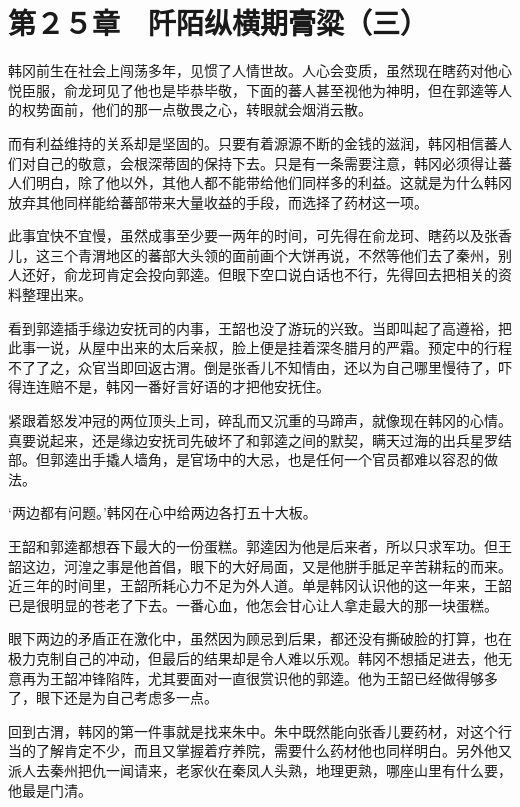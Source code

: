 \section{第２５章　阡陌纵横期膏粱（三）}

韩冈前生在社会上闯荡多年，见惯了人情世故。人心会变质，虽然现在瞎药对他心悦臣服，俞龙珂见了他也是毕恭毕敬，下面的蕃人甚至视他为神明，但在郭逵等人的权势面前，他们的那一点敬畏之心，转眼就会烟消云散。

而有利益维持的关系却是坚固的。只要有着源源不断的金钱的滋润，韩冈相信蕃人们对自己的敬意，会根深蒂固的保持下去。只是有一条需要注意，韩冈必须得让蕃人们明白，除了他以外，其他人都不能带给他们同样多的利益。这就是为什么韩冈放弃其他同样能给蕃部带来大量收益的手段，而选择了药材这一项。

此事宜快不宜慢，虽然成事至少要一两年的时间，可先得在俞龙珂、瞎药以及张香儿，这三个青渭地区的蕃部大头领的面前画个大饼再说，不然等他们去了秦州，别人还好，俞龙珂肯定会投向郭逵。但眼下空口说白话也不行，先得回去把相关的资料整理出来。

看到郭逵插手缘边安抚司的内事，王韶也没了游玩的兴致。当即叫起了高遵裕，把此事一说，从屋中出来的太后亲叔，脸上便是挂着深冬腊月的严霜。预定中的行程不了了之，众官当即回返古渭。倒是张香儿不知情由，还以为自己哪里慢待了，吓得连连赔不是，韩冈一番好言好语的才把他安抚住。

紧跟着怒发冲冠的两位顶头上司，碎乱而又沉重的马蹄声，就像现在韩冈的心情。真要说起来，还是缘边安抚司先破坏了和郭逵之间的默契，瞒天过海的出兵星罗结部。但郭逵出手撬人墙角，是官场中的大忌，也是任何一个官员都难以容忍的做法。

‘两边都有问题。’韩冈在心中给两边各打五十大板。

王韶和郭逵都想吞下最大的一份蛋糕。郭逵因为他是后来者，所以只求军功。但王韶这边，河湟之事是他首倡，眼下的大好局面，又是他胼手胝足辛苦耕耘的而来。近三年的时间里，王韶所耗心力不足为外人道。单是韩冈认识他的这一年来，王韶已是很明显的苍老了下去。一番心血，他怎会甘心让人拿走最大的那一块蛋糕。

眼下两边的矛盾正在激化中，虽然因为顾忌到后果，都还没有撕破脸的打算，也在极力克制自己的冲动，但最后的结果却是令人难以乐观。韩冈不想插足进去，他无意再为王韶冲锋陷阵，尤其要面对一直很赏识他的郭逵。他为王韶已经做得够多了，眼下还是为自己考虑多一点。

回到古渭，韩冈的第一件事就是找来朱中。朱中既然能向张香儿要药材，对这个行当的了解肯定不少，而且又掌握着疗养院，需要什么药材他也同样明白。另外他又派人去秦州把仇一闻请来，老家伙在秦凤人头熟，地理更熟，哪座山里有什么要，他最是门清。

